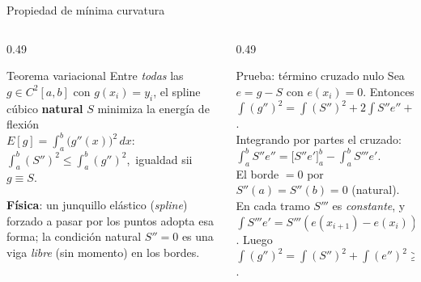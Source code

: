 \documentclass[aspectratio=169,10pt]{beamer}
\begin{document}
\begin{frame}{Propiedad de mínima curvatura}
\begin{columns}[T]
\begin{column}{0.49\textwidth}
\begin{cardidea}{Teorema variacional}{\faSuperscript}
{\footnotesize Entre \emph{todas} las $g\in C^2[a,b]$ con $g(x_i)=y_i$, el spline cúbico \textbf{natural} $S$ minimiza la energía de flexión\\[0.4mm]
$E[g]=\displaystyle\int_a^b\big(g''(x)\big)^2\,dx$:\\[0.8mm]
$\displaystyle\int_a^b (S'')^2\le\int_a^b (g'')^2$,\ igualdad sii $g\equiv S$.}
\end{cardidea}
\vspace{1mm}
\begin{cardnota}[\faInfoCircle]
{\footnotesize \textbf{Física}: un junquillo elástico (\emph{spline}) forzado a pasar por los puntos adopta esa forma; la condición natural $S''=0$ es una viga \emph{libre} (sin momento) en los bordes.}
\end{cardnota}
\end{column}
\begin{column}{0.49\textwidth}
\begin{cardgear}{Prueba: término cruzado nulo}{\faCogs}
{\footnotesize Sea $e=g-S$ con $e(x_i)=0$. Entonces\\[0.4mm]
$\displaystyle\int (g'')^2=\int (S'')^2+2\!\int S''e''+\int (e'')^2$.\\[0.8mm]
Integrando por partes el cruzado:\\[0.2mm]
$\displaystyle\int_a^b S''e''=\big[S''e'\big]_a^b-\int_a^b S'''e'$.\\[0.6mm]
El borde $=0$ por $S''(a)=S''(b)=0$ (natural). En cada tramo $S'''$ es \emph{constante}, y $\int S'''e'=S'''(e(x_{i+1})-e(x_i))=0$. Luego\\[0.4mm]
$\displaystyle\int (g'')^2=\int (S'')^2+\int (e'')^2\ge\int (S'')^2$.}
\end{cardgear}
\end{column}
\end{columns}
\end{frame}
\end{document}
